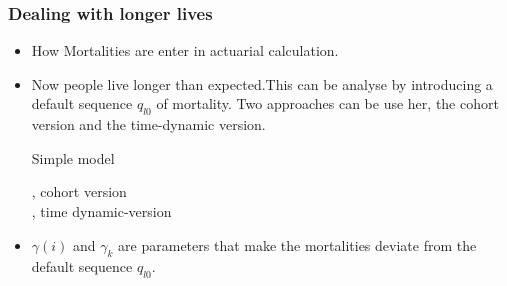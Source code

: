 \documentclass{beamer}
\begin{document}
\begin{frame}
\frametitle{Dealing with longer lives}
\begin{itemize}


 \item How Mortalities are enter in actuarial calculation.
 
\vspace{5mm}

\vspace{5mm} \item Now people live longer than expected.This can be analyse by introducing a default sequence $q_{l0}$ of mortality. Two approaches can be use her, the cohort version and the time-dynamic version.

\begin{block}{Simple model}

\hspace{5mm}, cohort version\\
\hspace{5mm} , time dynamic-version

\end{block}
\item $\gamma(i)$ and ${\gamma}_k$ are parameters that make the mortalities deviate from the default sequence $q_{l0}$.
\end{itemize}

\end{frame}
\end{document}
